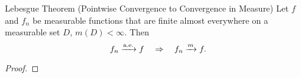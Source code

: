\begin{theorem}{Lebesgue Theorem (Pointwise Convergence to Convergence in Measure)}{}
  Let $f$ and $f_n$ be measurable functions that are finite almost everywhere on
  a measurable set $D$, $m(D) < \infty$. Then
  \begin{equation}
    f_n \xrightarrow{\text{a.e.}} f \quad \Rightarrow \quad f_n \xrightarrow{m} f.
  \end{equation}
\end{theorem}

\begin{proof}
  
\end{proof}










